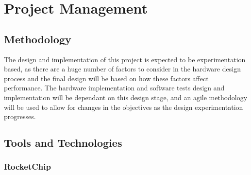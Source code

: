 \chapter{Project Management}
\label{ch:project_management}

\section{Methodology}
The design and implementation of this project is expected to be experimentation based, as there are a huge number of factors to consider in the hardware design process and the final design will be based on how these factors affect performance. The hardware implementation and software tests design and implementation will be dependant on this design stage, and an agile methodology will be used to allow for changes in the objectives as the design experimentation progresses.

\section{Tools and Technologies}
\subsection{RocketChip} %
\subsection{}